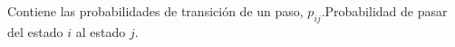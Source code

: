\documentclass[preview]{standalone}
\begin{document}
\begin{center}
Contiene las probabilidades de transición de un paso, $p_{ij}$.Probabilidad de pasar del estado $i$ al estado $j$.
\end{center}
\end{document}
